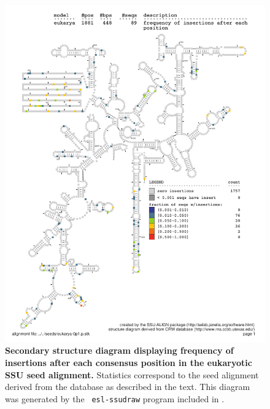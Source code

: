 \begin{figure}
\begin{center}
\includegraphics[width=5.7in]{Figures/eukarya-0p1-ifreq}
\end{center}
\caption[Secondary structure diagram displaying frequency of insertions
  after each consensus position in the eukaryotic SSU seed
  alignment]{\textbf{Secondary structure diagram displaying frequency
  of insertions after each consensus position in the eukaryotic SSU seed
  alignment.} Statistics correspond to the  seed
  alignment derived from the  database \cite{CannoneGutell02}
  as described in the text. This diagram was generated by the {\tt
  esl-ssudraw} program included in .}
\label{fig:eukins}
\end{figure}


